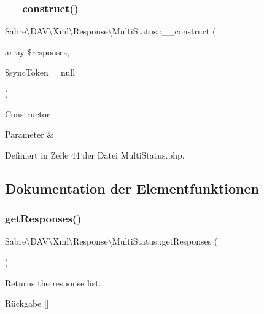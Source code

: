 \subsubsection{\texorpdfstring{\+\_\+\+\_\+construct()}{\_\_construct()}}
{\footnotesize\ttfamily Sabre\textbackslash{}\+D\+A\+V\textbackslash{}\+Xml\textbackslash{}\+Response\textbackslash{}\+Multi\+Status\+::\+\_\+\+\_\+construct (\begin{DoxyParamCaption}\item[{array}]{\$responses,  }\item[{}]{\$sync\+Token = {\ttfamily null} }\end{DoxyParamCaption})}

Constructor


\begin{DoxyParams}{Parameter}
{\em } & \\
\hline
\end{DoxyParams}


Definiert in Zeile 44 der Datei Multi\+Status.\+php.



\subsection{Dokumentation der Elementfunktionen}
\mbox{\label{class_sabre_1_1_d_a_v_1_1_xml_1_1_response_1_1_multi_status_a3f57a1d5e7b37f32cd916d98853a821d}} 
\subsubsection{\texorpdfstring{get\+Responses()}{getResponses()}}
{\footnotesize\ttfamily Sabre\textbackslash{}\+D\+A\+V\textbackslash{}\+Xml\textbackslash{}\+Response\textbackslash{}\+Multi\+Status\+::get\+Responses (\begin{DoxyParamCaption}{ }\end{DoxyParamCaption})}

Returns the response list.

\begin{DoxyReturn}{Rückgabe}
\mbox{[}\mbox{]} 
\end{DoxyReturn}


